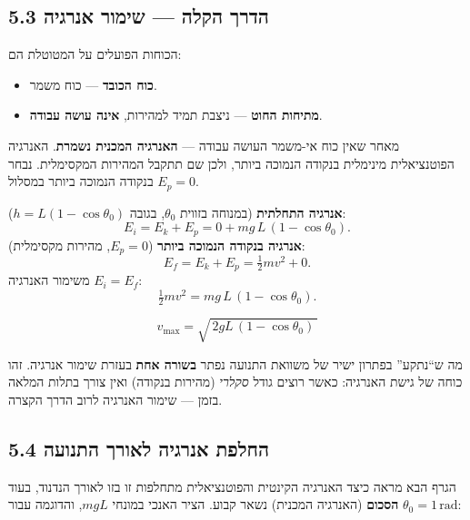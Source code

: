 \documentclass[12pt, a4paper]{article}
\begin{document}
\subsection*{5.3 הדרך הקלה --- שימור אנרגיה}

הכוחות הפועלים על המטוטלת הם:
\begin{itemize}
  \item \textbf{כוח הכובד} --- כוח משמר.
  \item \textbf{מתיחות החוט} --- ניצבת תמיד למהירות, \textbf{אינה עושה עבודה}.
\end{itemize}
מאחר שאין כוח אי-משמר העושה עבודה --- \textbf{האנרגיה המכנית נשמרת}. האנרגיה הפוטנציאלית מינימלית בנקודה הנמוכה ביותר, ולכן שם תתקבל המהירות המקסימלית. נבחר \textenglish{$E_p = 0$} בנקודה הנמוכה ביותר במסלול.

\textbf{אנרגיה התחלתית} (במנוחה בזווית \textenglish{$\theta_0$}, בגובה \textenglish{$h = L(1-\cos\theta_0)$}):
\[
  E_i = E_k + E_p = 0 + mg\,L\,(1 - \cos\theta_0).
\]
\textbf{אנרגיה בנקודה הנמוכה ביותר} (\textenglish{$E_p = 0$}, מהירות מקסימלית):
\[
  E_f = E_k + E_p = \tfrac{1}{2} m v^2 + 0.
\]
משימור האנרגיה \textenglish{$E_i = E_f$}:
\[
  \tfrac{1}{2} m v^2 = mg\,L\,(1 - \cos\theta_0).
\]
\begin{tcolorbox}[resultbox, title={מהירות מקסימלית של מטוטלת}]
\[
  v_{\max} = \sqrt{\,2 g L\,(1 - \cos\theta_0)\,}
\]
\end{tcolorbox}

\begin{tcolorbox}[notebox, title={המסר}]
מה ש``נתקע'' בפתרון ישיר של משוואת התנועה נפתר \textbf{בשורה אחת} בעזרת שימור אנרגיה. זהו כוחה של גישת האנרגיה: כאשר רוצים גודל \emph{סקלרי} (מהירות בנקודה) ואין צורך בתלות המלאה בזמן --- שימור האנרגיה לרוב הדרך הקצרה.
\end{tcolorbox}

\subsection*{5.4 החלפת אנרגיה לאורך התנועה}

הגרף הבא מראה כיצד האנרגיה הקינטית והפוטנציאלית מתחלפות זו בזו לאורך הנדנוד, בעוד \textbf{הסכום} (האנרגיה המכנית) נשאר קבוע. הציר האנכי במונחי \textenglish{$mgL$}, והדוגמה עבור \textenglish{$\theta_0 = 1\,\text{rad}$}:

\begin{center}
\end{center}
\end{document}
